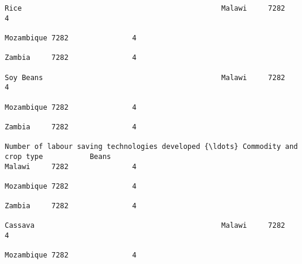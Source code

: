 \documentclass[11pt]{article}
\begin{document}
\begin{Verbatim}[commandchars=\\\{\}]
                                                                                                                                                              Rice                                               Malawi     7282               4  
                                                                                                                                                                                                                 Mozambique 7282               4  
                                                                                                                                                                                                                 Zambia     7282               4  
                                                                                                                                                              Soy Beans                                          Malawi     7282               4  
                                                                                                                                                                                                                 Mozambique 7282               4  
                                                                                                                                                                                                                 Zambia     7282               4  
                                                                         Number of labour saving technologies developed {\ldots} Commodity and crop type           Beans                                              Malawi     7282               4  
                                                                                                                                                                                                                 Mozambique 7282               4  
                                                                                                                                                                                                                 Zambia     7282               4  
                                                                                                                                                              Cassava                                            Malawi     7282               4  
                                                                                                                                                                                                                 Mozambique 7282               4  

\end{Verbatim}
\end{document}
